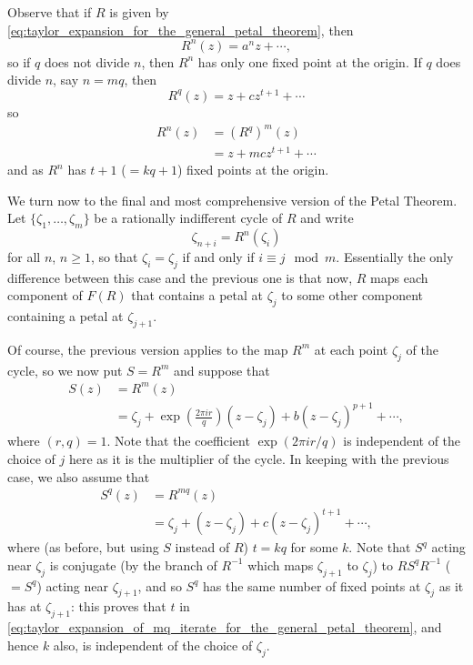Observe that if $R$ is given by
\eqref{eq:taylor_expansion_for_the_general_petal_theorem}, then
\begin{equation*}
    R^n(z) = a^n z + \cdots,
\end{equation*}
so if $q$ does not divide $n$, then $R^n$ has only one fixed point at the
origin. If $q$ does divide $n$, say $n = mq$, then
\begin{equation*}
    R^q(z) = z + cz^{t+1} + \cdots
\end{equation*}
so
\begin{align*}
    R^n(z) &= (R^q)^m(z) \\
           &= z + mcz^{t+1} + \cdots
\end{align*}
and as $R^n$ has $t + 1$ ($= kq + 1$) fixed points at the origin.

We turn now to the final and most comprehensive version of the Petal Theorem.
Let $\{\zeta_1, \dots, \zeta_m\}$ be a rationally indifferent cycle of $R$ and
write
\begin{equation*}
    \zeta_{n+i} = R^n(\zeta_i)
\end{equation*}
for all $n$, $n \geq 1$, so that $\zeta_i = \zeta_j$ if and only if $i \equiv j
\mod m$. Essentially the only difference between this case and the previous one
is that now, $R$ maps each component of $F(R)$ that contains a petal at
$\zeta_j$ to some other component containing a petal at $\zeta_{j+1}$.

Of course, the previous version applies to the map $R^m$ at each point $\zeta_j$
of the cycle, so we now put $S = R^m$ and suppose that
\begin{align}
    \label{eq:taylor_expansion_of_m_iterate_for_the_general_petal_theorem}
    S(z) &= R^m(z) \\
         &= \zeta_j + \exp\left(\frac{2\pi i r}{q}\right) (z - \zeta_j) + b(z - \zeta_j)^{p+1} + \cdots,
\end{align}
where $(r, q) = 1$. Note that the coefficient $\exp(2\pi i r/q)$ is independent
of the choice of $j$ here as it is the multiplier of the cycle. In keeping with
the previous case, we also assume that
\begin{align}
    \label{eq:taylor_expansion_of_mq_iterate_for_the_general_petal_theorem}
    S^q(z) &= R^{mq}(z) \\
         &= \zeta_j + (z - \zeta_j) + c(z - \zeta_j)^{t+1} + \cdots,
\end{align}
where (as before, but using $S$ instead of $R$) $t = kq$ for some $k$. Note that
$S^q$ acting near $\zeta_j$ is conjugate (by the branch of $R^{-1}$ which maps
$\zeta_{j+1}$ to $\zeta_j$) to $R S^q R^{-1}$ ($= S^q$) acting near
$\zeta_{j+1}$, and so $S^q$ has the same number of fixed points at $\zeta_j$ as
it has at $\zeta_{j+1}$: this proves that $t$ in
\eqref{eq:taylor_expansion_of_mq_iterate_for_the_general_petal_theorem}, and
hence $k$ also, is independent of the choice of $\zeta_j$.


